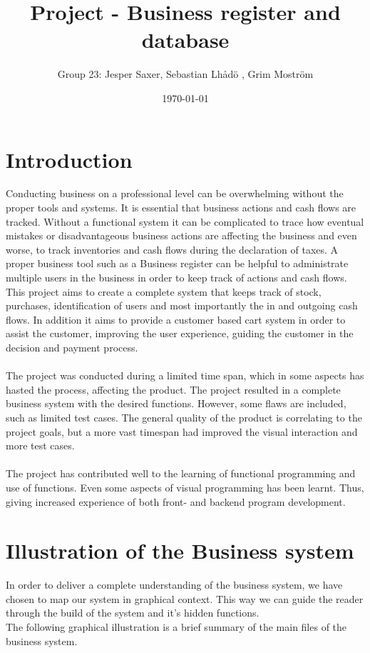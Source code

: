 \documentclass[11pt]{article}
\begin{document}
\title{Project - Business register and database}
\author{Group 23: Jesper Saxer, Sebastian Lhådö , Grim Moström}
\date{\today}
\maketitle{}
\pagebreak
\section{Introduction}
Conducting business on a professional level can be overwhelming without the proper tools and systems. It is essential that business actions and cash flows are tracked. Without  a functional system it can be complicated to trace how eventual mistakes or disadvantageous business actions are affecting the business and even worse, to track inventories and cash flows during the declaration of taxes. A proper business tool such as a Business register can be helpful to administrate multiple users in the business in order to keep track of actions and cash flows.
This project aims to create a complete system that keeps track of stock, purchases, identification of users and most importantly the in and outgoing cash flows. In addition it aims to provide a customer based cart system in order to assist the customer, improving the user experience, guiding the customer in the decision and payment process.\\\\
The project was conducted during a limited time span, which in some aspects has hasted the process, affecting the product. The project resulted in a complete business system with the desired functions. However, some flaws are included, such as limited test cases. The general quality of the product is correlating to the project goals, but a more vast timespan had improved the visual interaction and more test cases.\\\\
The project has contributed well to the learning of functional programming and use of functions. Even some aspects of visual programming has been learnt. Thus, giving increased experience of both front- and backend program development.
\pagebreak
\tableofcontents
\pagebreak
\section{Illustration of the Business system}
In order to deliver a complete understanding of the business system, we have chosen to map our system in graphical context. This way we can guide the reader through the build of the system and it’s hidden functions.
\\
The following graphical illustration is a brief summary of the main files of the business system.
\end{document}
